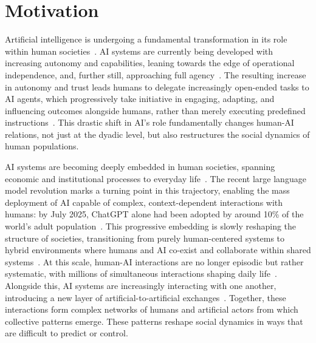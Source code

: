 
\section{Motivation}

Artificial intelligence is undergoing a fundamental transformation in its role within human societies~\cite{rahwanMachineBehaviour2019}. AI systems are currently being developed with increasing autonomy and capabilities, leaning towards the edge of operational independence, and, further still, approaching full agency~\cite{hanSocialPhysicsAge2026}. The resulting increase in autonomy and trust leads humans to delegate increasingly open-ended tasks to AI agents, which progressively take initiative in engaging, adapting, and influencing outcomes alongside humans, rather than merely executing predefined instructions~\cite{hanSocialPhysicsAge2026}. This drastic shift in AI's role fundamentally changes human-AI relations, not just at the dyadic level, but also restructures the social dynamics of human populations.

AI systems are becoming deeply embedded in human societies, spanning economic and institutional processes to everyday life~\cite{rahwanMachineBehaviour2019}. The recent large language model revolution marks a turning point in this trajectory, enabling the mass deployment of AI capable of complex, context-dependent interactions with humans: by July 2025, ChatGPT alone had been adopted by around 10\% of the world's adult population~\cite{Chatterji2025}. This progressive embedding is slowly reshaping the structure of societies, transitioning from purely human-centered systems to hybrid environments where humans and AI co-exist and collaborate within shared systems~\cite{hanSocialPhysicsAge2026}. At this scale, human-AI interactions are no longer episodic but rather systematic, with millions of simultaneous interactions shaping daily life~\cite{pedreschiHumanAICoevolution2025}. Alongside this, AI systems are increasingly interacting with one another, introducing a new layer of artificial-to-artificial exchanges~\cite{dafoeOpenProblemsCooperative2020}. Together, these interactions form complex networks of humans and artificial actors from which collective patterns emerge. These patterns reshape social dynamics in ways that are difficult to predict or control.

